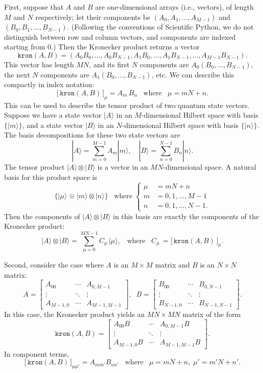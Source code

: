 \documentclass[pra,12pt]{revtex4}
\begin{document}
First, suppose that $A$ and $B$ are one-dimensional arrays (i.e.,
vectors), of length $M$ and $N$ respectively; let their components be
$(A_0, A_1, \dots, A_{M-1})$ and $(B_0, B_1, \dots, B_{N-1})$.
(Following the conventions of Scientific Python, we do not distinguish
between row and column vectors, and components are indexed starting
from 0.)  Then the Kronecker product returns a vector
$$\texttt{kron}(A, B) = (A_0B_0,\dots, A_0 B_{N-1}, A_1 B_0, \dots, A_1 B_{N-1}, \dots, A_{M-1}B_{N-1}).$$
This vector has length $MN$, and its first $N$ components are $A_0
(B_0, \dots,B_{N-1})$, the next $N$ components are $A_1 (B_0, \dots,
B_{N-1})$, etc.  We can describe this compactly in index notation:
$$\big[\, \texttt{kron}(A, B) \,\big]_{\mu} = A_m \, B_n \;\;\;\mathrm{where}\;\;\;\mu = mN+n.$$
This can be used to describe the tensor product of two quantum state
vectors.  Suppose we have a state vector $|A\rangle$ in an
$M$-dimensional Hilbert space with basis $\{|m\rangle\}$, and a state
vector $|B\rangle$ in an $N$-dimensional Hilbert space with basis
$\{|n\rangle\}$.  The basis decompositions for these two state vectors
are
$$|A\rangle = \sum_{m=0}^{M-1} A_m |m\rangle, \quad |B\rangle = \sum_{n=0}^{N-1} B_n |n\rangle.$$
The tensor product $|A\rangle\otimes|B\rangle$ is a vector in an
$MN$-dimensional space.  A natural basis for this product space is
$$\Big\{|\mu\rangle \equiv |m\rangle\otimes |n\rangle\Big\} \;\;\;\mathrm{where} \;\begin{cases}\mu\!\!\!\! &= mN+n \\ m \!\!\!\!&= 0,1,\dots,M-1 \\ n \!\!\!\!&= 0,1, \dots, N-1.\end{cases}$$
Then the components of $|A\rangle\otimes|B\rangle$ in this basis are
exactly the components of the Kronecker product:
$$|A\rangle\otimes|B\rangle = \sum_{\mu=0}^{MN-1} C_\mu \, |\mu\rangle, \;\;\; \mathrm{where}\;\;\; C_\mu\, = \big[\,\texttt{kron}(A,B)\,\big]_\mu.$$

Second, consider the case where $A$ is an $M\times M$ matrix and $B$
is an $N\times N$ matrix:
$$A = \begin{bmatrix}A_{00} & \cdots & A_{0,M-1} \\ \vdots & \ddots & \vdots \\ A_{M-1,0} & \cdots & A_{M-1,M-1} \end{bmatrix}, \;\; B = \begin{bmatrix}B_{00} & \cdots & B_{0,N-1} \\ \vdots & \ddots & \vdots \\  B_{N-1,0} & \cdots & B_{N-1,N-1} \end{bmatrix}.$$
In this case, the Kronecker product yields an $MN\times MN$ matrix of
the form
$$\texttt{kron}(A,B) = \begin{bmatrix} A_{00}B & \cdots & A_{0,M-1}B \\ \vdots & \ddots & \vdots \\ A_{M-1,0}B & \cdots & A_{M-1,M-1}B\end{bmatrix}.$$
In component terms,
$$\big[\,\texttt{kron}(A,B)\,\big]_{\mu\mu'} = A_{mm'} B_{nn'}\;\;\;\mathrm{where}\;\;\;\mu = mN+n, \; \mu' = m'N+n'.$$
\end{document}
